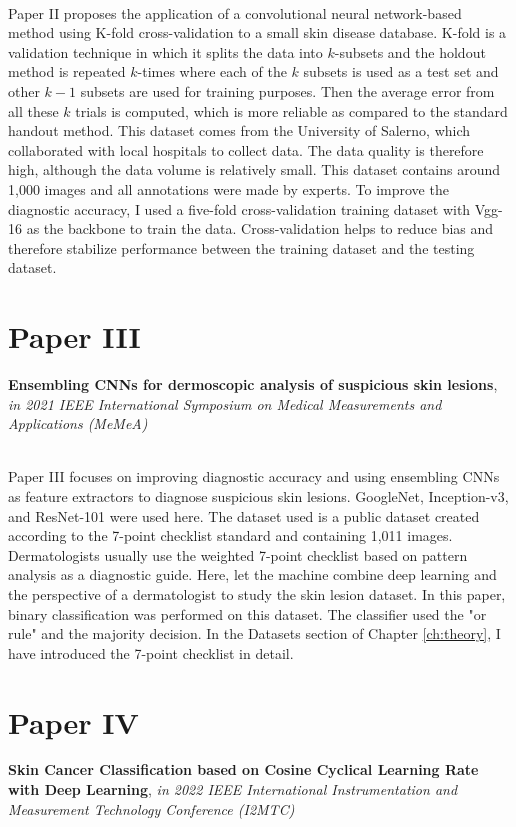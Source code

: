 ~\\

Paper II proposes the application of a convolutional neural network-based method using K-fold cross-validation to a small skin disease database. K-fold is a validation technique in which it splits the data into $k$-subsets and the holdout method is repeated $k$-times where each of the $k$ subsets is used as a test set and other $k-1$ subsets are used for training purposes. Then the average error from all these $k$ trials is computed, which is more reliable as compared to the standard handout method. This dataset comes from the University of Salerno, which collaborated with local hospitals to collect data. The data quality is therefore high, although the data volume is relatively small. This dataset contains around 1,000 images and all annotations were made by experts. To improve the diagnostic accuracy, I used a five-fold cross-validation training dataset with Vgg-16 as the backbone to train the data. Cross-validation helps to reduce bias and therefore stabilize performance between the training dataset and the testing dataset.
 

\section*{Paper III}
\textbf{Ensembling CNNs for dermoscopic analysis of
suspicious skin lesions}, \textit{in 2021 IEEE International Symposium on Medical Measurements and Applications (MeMeA)}



~\\

Paper III focuses on improving diagnostic accuracy and using ensembling CNNs as feature extractors to diagnose suspicious skin lesions. GoogleNet, Inception-v3, and ResNet-101 were used here. The dataset used is a public dataset created according to the 7-point checklist standard and containing 1,011 images. Dermatologists usually use the weighted 7-point checklist based on pattern analysis as a diagnostic guide. Here, let the machine combine deep learning and the perspective of a dermatologist to study the skin lesion dataset. In this paper, binary classification was performed on this dataset. The classifier used the "or rule" and the majority decision. In the Datasets section of Chapter \ref{ch:theory}, I have introduced the 7-point checklist in detail. 


\section*{Paper IV}
\textbf{Skin Cancer Classification based on Cosine Cyclical Learning Rate with Deep Learning}, \textit{in 2022 IEEE International Instrumentation and Measurement Technology Conference (I2MTC)}



